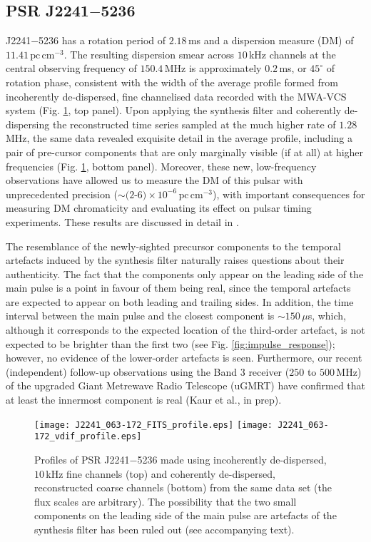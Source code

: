 \documentclass{pasa}%
\newcommand{\psrkaurJ}{J2241$-$5236}
\newcommand{\dmunits}{\ensuremath{\text{pc}\,\text{cm}^{-3}}}
\begin{document}
\subsection{PSR \psrkaurJ{}}

\psrkaurJ{} has a rotation period of $2.18\,$ms and a dispersion measure (DM) of $11.41\,\dmunits$.
The resulting dispersion smear across $10\,$kHz channels at the central observing frequency of $150.4\,$MHz is approximately $0.2\,$ms, or $45^\circ$ of rotation phase, consistent with the width of the average profile formed from incoherently de-dispersed, fine channelised data recorded with the MWA-VCS system (Fig. \ref{fig:J2241_profiles}, top panel).
Upon applying the synthesis filter and coherently de-dispersing the reconstructed time series sampled at the much higher rate of $1.28\,$MHz, the same data revealed exquisite detail in the average profile, including a pair of pre-cursor components that are only marginally visible (if at all) at higher frequencies (Fig. \ref{fig:J2241_profiles}, bottom panel).
Moreover, these new, low-frequency observations have allowed us to measure the DM of this pulsar with unprecedented precision ($\sim (2$-$6) \times 10^{-6}\,\dmunits$), with important consequences for measuring DM chromaticity and evaluating its effect on pulsar timing experiments.
These results are discussed in detail in \citet{Kaur2019}.

The resemblance of the newly-sighted precursor components to the temporal artefacts induced by the synthesis filter naturally raises questions about their authenticity.
The fact that the components only appear on the leading side of the main pulse is a point in favour of them being real, since the temporal artefacts are expected to appear on both leading and trailing sides.
In addition, the time interval between the main pulse and the closest component is $\sim150\,\mu$s, which, although it corresponds to the expected location of the third-order artefact, is not expected to be brighter than the first two (see Fig. \ref{fig:impulse_response}); however, no evidence of the lower-order artefacts is seen.
Furthermore, our recent (independent) follow-up observations using the Band 3 receiver ($250$ to $500\,$MHz) of the upgraded Giant Metrewave Radio Telescope (uGMRT) have confirmed that at least the innermost component is real (Kaur et al., in prep).

\begin{figure}[t!]
    \centering
    \texttt{[image: J2241\_063-172\_FITS\_profile.eps]}
    \texttt{[image: J2241\_063-172\_vdif\_profile.eps]}
    \caption{Profiles of PSR \psrkaurJ{} made using incoherently de-dispersed, $10\,$kHz fine channels (top) and coherently de-dispersed, reconstructed coarse channels (bottom) from the same data set \citep{Kaur2019} (the flux scales are arbitrary). The possibility that the two small components on the leading side of the main pulse are artefacts of the synthesis filter has been ruled out (see accompanying text).}
    \label{fig:J2241_profiles}
\end{figure}
\end{document}
